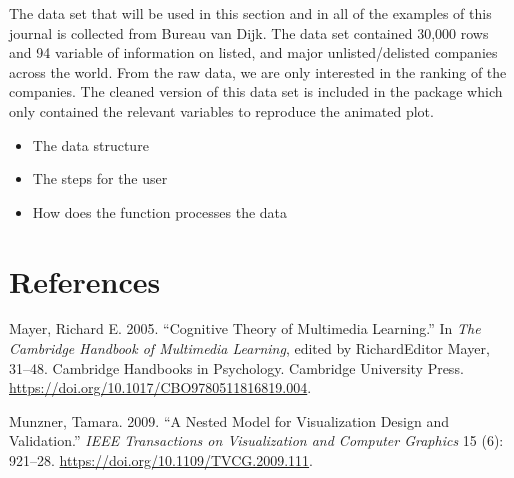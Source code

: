 The data set that will be used in this section and in all of the examples of this journal is collected from Bureau van Dijk. The data set contained 30,000 rows and 94 variable of information on listed, and major unlisted/delisted companies across the world. From the raw data, we are only interested in the ranking of the companies. The cleaned version of this data set is included in the package which only contained the relevant variables to reproduce the animated plot.

\begin{itemize}
\tightlist
\item
  The data structure
\item
  The steps for the user
\item
  How does the function processes the data
\end{itemize}

\hypertarget{references}{%
\section*{References}\label{references}}

\hypertarget{refs}{}
\begin{CSLReferences}{1}{0}
\leavevmode{}%
Mayer, Richard E. 2005. {``Cognitive Theory of Multimedia Learning.''} In \emph{The Cambridge Handbook of Multimedia Learning}, edited by RichardEditor Mayer, 31--48. Cambridge Handbooks in Psychology. Cambridge University Press. \url{https://doi.org/10.1017/CBO9780511816819.004}.

\leavevmode{}%
Munzner, Tamara. 2009. {``A Nested Model for Visualization Design and Validation.''} \emph{IEEE Transactions on Visualization and Computer Graphics} 15 (6): 921--28. \url{https://doi.org/10.1109/TVCG.2009.111}.

\end{CSLReferences}



\address{%
Krisanat Anukarnsakulchularp\\
Monash University\\%
Faculty of Business and Economics\\ Melbourne, Australia\\
%
%
\textit{ORCiD: \href{https://orcid.org/0009-0008-5638-7124}{0009-0008-5638-7124}}\\%
\href{mailto:kanu0003@student.monash.edu}{\nolinkurl{kanu0003@student.monash.edu}}%
}
